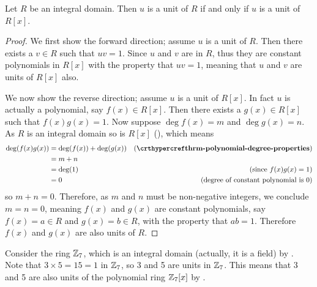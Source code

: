 \begin{proposition}\label{prop-unit-of-ring-iff-unit-of-polynomial-ring}
    Let $R$ be an integral domain. Then $u$ is a unit of $R$ if and only if $u$ is a unit of $R[x]$.
\end{proposition}
\begin{proof}
    We first show the forward direction; assume $u$ is a unit of $R$. Then there exists a $v \in R$ such that $uv = 1$. Since $u$ and $v$ are in $R$, thus they are constant polynomials in $R[x]$ with the property that $uv = 1$, meaning that $u$ and $v$ are units of $R[x]$ also.

    We now show the reverse direction; assume $u$ is a unit of $R[x]$. In fact $u$ is actually a polynomial, say $f(x) \in R[x]$. Then there exists a $g(x) \in R[x]$ such that $f(x)g(x) = 1$. Now suppose $\deg f(x) = m$ and $\deg g(x) = n$. As $R$ is an integral domain so is $R[x]$ (), which means
    \begin{align*}
        \deg(f(x)g(x)) &= \deg(f(x)) + \deg(g(x)) & (\myref{thrm-polynomial-degree-properties})\\
        &= m + n\\
        &= \deg(1) & (\text{since }f(x)g(x) = 1)\\
        &= 0 & (\text{degree of constant polynomial is 0})
    \end{align*}
    so $m + n = 0$. Therefore, as $m$ and $n$ must be non-negative integers, we conclude $m = n = 0$, meaning $f(x)$ and $g(x)$ are constant polynomials, say $f(x) = a \in R$ and $g(x) = b \in R$, with the property that $ab = 1$. Therefore $f(x)$ and $g(x)$ are also units of $R$.
\end{proof}
\begin{example}
    Consider the ring $\mathbb{Z}_7$, which is an integral domain (actually, it is a field) by . Note that $3 \times 5 = 15 = 1$ in $\mathbb{Z}_7$, so 3 and 5 are units in $\mathbb{Z}_7$. This means that 3 and 5 are also units of the polynomial ring $\mathbb{Z}_7[x]$ by .
\end{example}

